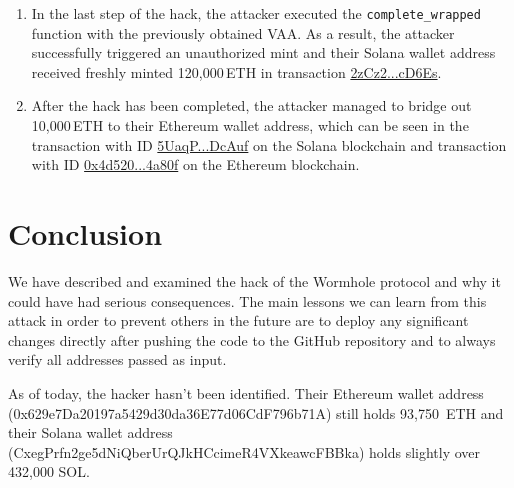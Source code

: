 \documentclass{article}
\begin{document}
\begin{enumerate}
\item In the last step of the hack, the attacker executed the \texttt{complete\_wrapped} function with the previously obtained VAA. As a result, the attacker successfully triggered an unauthorized mint and their Solana wallet address received freshly minted 120,000\,ETH in transaction \href{https://solscan.io/tx/2zCz2GgSoSS68eNJENWrYB48dMM1zmH8SZkgYneVDv2G4gRsVfwu5rNXtK5BKFxn7fSqX9BvrBc1rdPAeBEcD6Es}{2zCz2...cD6Es}.

\item After the hack has been completed, the attacker managed to bridge out 10,000\,ETH to their Ethereum wallet address, which can be seen in the transaction with ID \href{https://solscan.io/tx/5UaqPus91wvAzKNve6L8YAHsESomZQ7GWi37gPFyzTHcXNMZA641bb8m8txo7bS7A5cAnzKDKYyiKcQC8GgDcAuf}{5UaqP...DcAuf} on the Solana blockchain and transaction with ID \href{https://etherscan.io/tx/0x4d5201dd4a377f20e61fb8f42e6f929ec16bcec918f0584e39241d15b254a80f}{0x4d520...4a80f} on the Ethereum blockchain.
\end{enumerate}

\section{Conclusion}
We have described and examined the hack of the Wormhole protocol and why it could have had serious consequences. The main lessons we can learn from this attack in order to prevent others in the future are to deploy any significant changes directly after pushing the code to the GitHub repository and to always verify all addresses passed as input.

As of today, the hacker hasn't been identified. Their Ethereum wallet address (0x629e7Da20197\-a5429d30da36E77d06CdF796b71A) still holds 93,750~ETH and their Solana wallet address (CxegPrfn\-2ge5dNiQberUrQJkHCcimeR4VXkeawcFBBka) holds slightly over 432,000 SOL.



\end{document}
